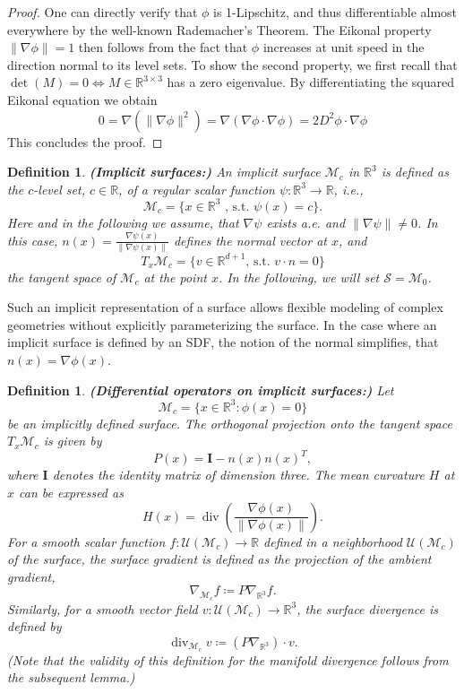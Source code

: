 \documentclass[12pt,openany]{book}
\newcommand{\R}{\mathbb{R}}
\def\S{\mathcal{S}}
\theoremstyle{plainnormal}
\newtheorem{definition}[theorem]{Definition}
\theoremstyle{remark}
\begin{document}
\begin{proof}
    One can directly verify that \( \phi \) is 1-Lipschitz, and thus differentiable almost everywhere by the well-known Rademacher's Theorem. The Eikonal property \( \|\nabla \phi\| = 1 \) then follows from the fact that \( \phi \) increases at unit speed in the direction normal to its level sets. To show the second property, we first recall that {$\det(M) = 0 \Leftrightarrow M\in\R^{3\times3}$} has a zero eigenvalue. By differentiating the squared Eikonal equation we obtain
    \begin{equation*}
        0 = \nabla(\|\nabla \phi\|^2)
        = \nabla ( \nabla \phi \cdot \nabla\phi)
        = 2 D^2 \phi \cdot \nabla\phi
    \end{equation*} 
    This concludes the proof.
\end{proof}
\begin{definition}\textbf{(Implicit surfaces:)}
    An \emph{implicit surface} $\mathcal{M}_c$ in $\R^3$ is defined as the $c$-level set, $c\in \R$, of a regular scalar function $\psi: \R^3\rightarrow\R$, i.e.,
$$\mathcal M_c=\{x\in\R^3 \text{ , s.t. } \psi(x)=c\}.$$
Here and in the following we assume, that $\nabla\psi$ exists a.e. and $\|\nabla \psi\|\neq 0$.
    In this case, $n(x) = \frac{\nabla \psi(x)}{\|\nabla \psi(x)\|}$ defines the normal vector at $x$, and $$T_x\mathcal{M}_c = \{v\in \R^{d+1} \text{, s.t. } v\cdot n = 0\}$$ the tangent space of $\mathcal{M}_c$ at the point $x$. In the following, we will set $\S = \mathcal{M}_0$.
\end{definition}
Such an implicit representation of a surface allows flexible modeling of complex geometries without explicitly parameterizing the surface. In the case where an implicit surface is defined by an SDF, the notion of the normal simplifies, that \mbox{$n(x) = {\nabla \phi(x)}$}.  
\begin{definition}\label{def:diff_ops_implicit_surface}\textbf{(Differential operators on implicit surfaces:)} Let $$\mathcal{M}_c = \{ x \in \mathbb{R}^{3} : \phi(x) = 0 \}$$ be an implicitly defined surface. 
The \emph{orthogonal projection} onto the tangent space \(T_x \mathcal{M}_c\) is given by
\[
P(x) = \mathbf I - n(x) n(x)^T,
\]
where \(\mathbf I\) denotes the identity matrix of dimension three.
The \emph{mean curvature} \(H\) at \(x\) can be expressed as
\[
H(x) =  \operatorname{div} \left( \frac{\nabla \phi(x)}{\|\nabla \phi(x)\|} \right).
\]
For a smooth scalar function \(f : \mathcal{U}(\mathcal{M}_c) \to \mathbb{R}\) defined in a neighborhood \(\mathcal{U}(\mathcal{M}_c)\) of the surface, the \emph{surface gradient} is defined as the projection of the ambient gradient,
\[
\nabla_{\mathcal{M}_c} f \coloneqq P \nabla_{\mathbb{R}^{3}} f.
\]
Similarly, for a smooth vector field \(v : \mathcal{U}(\mathcal{M}_c) \to \mathbb{R}^{3}\), the \emph{surface divergence} is defined by
\[
\operatorname{div}_{\mathcal{M}_c} v \coloneqq  (P \nabla_{\mathbb{R}^{3}}) \cdot v.
\]
(Note that the validity of this definition for the manifold divergence follows from the subsequent lemma.)
\end{definition}
\end{document}
